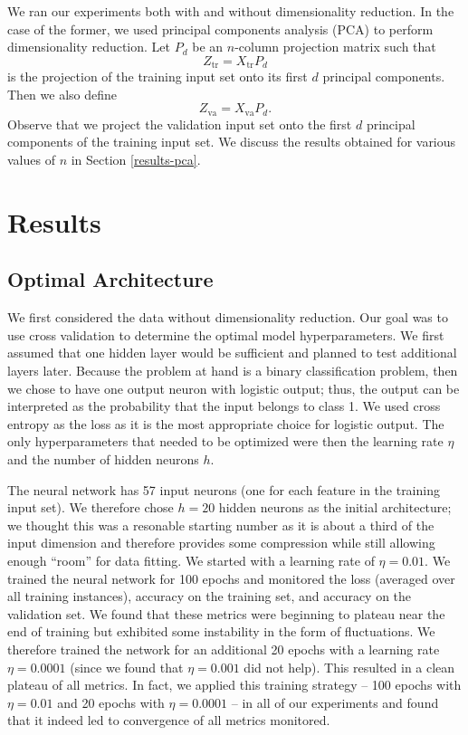 \documentclass[12pt]{article}
\newcommand{\Xtr}{X_{\mbox{tr}}}
\newcommand{\Xva}{X_{\mbox{va}}}
\newcommand{\Ztr}{Z_{\mbox{tr}}}
\newcommand{\Zva}{Z_{\mbox{va}}}
\begin{document}
We ran our experiments both with and without dimensionality reduction. In the case of the former, we used principal components analysis (PCA) to perform dimensionality reduction. Let $P_d$ be an $n$-column projection matrix such that
\[ \Ztr = \Xtr P_d \]
is the projection of the training input set onto its first $d$ principal components. Then we also define
\[ \Zva = \Xva P_d. \]
Observe that we project the validation input set onto the first $d$ principal components of the training input set. We discuss the results obtained for various values of $n$ in Section \ref{results-pca}.


\section{Results}

\subsection{Optimal Architecture}

We first considered the data without dimensionality reduction. Our goal was to use cross validation to determine the optimal model hyperparameters. We first assumed that one hidden layer would be sufficient and planned to test additional layers later. Because the problem at hand is a binary classification problem, then we chose to have one output neuron with logistic output; thus, the output can be interpreted as the probability that the input belongs to class 1. We used cross entropy as the loss as it is the most appropriate choice for logistic output. The only hyperparameters that needed to be optimized were then the learning rate $\eta$ and the number of hidden neurons $h$.

The neural network has 57 input neurons (one for each feature in the training input set). We therefore chose $h=20$ hidden neurons as the initial architecture; we thought this was a resonable starting number as it is about a third of the input dimension and therefore provides some compression while still allowing enough ``room'' for data fitting. We started with a learning rate of $\eta=0.01$. We trained the neural network for 100 epochs and monitored the loss (averaged over all training instances), accuracy on the training set, and accuracy on the validation set. We found that these metrics were beginning to plateau near the end of training but exhibited some instability in the form of fluctuations. We therefore trained the network for an additional 20 epochs with a learning rate $\eta=0.0001$ (since we found that $\eta=0.001$ did not help). This resulted in a clean plateau of all metrics. In fact, we applied this training strategy -- 100 epochs with $\eta=0.01$ and 20 epochs with $\eta=0.0001$ -- in all of our experiments and found that it indeed led to convergence of all metrics monitored.
\end{document}

